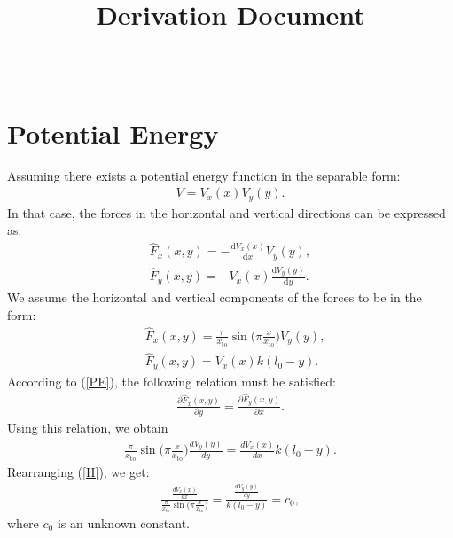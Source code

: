 \documentclass[journal,12pt,onecolumn]{IEEEtran}
\begin{document}
\title{Derivation Document}

\author{
\and\\

}
\maketitle



\section{Potential Energy}
Assuming there exists a potential energy function in the separable form:
\begin{align}
	\label{PE}
	V = V_x(x)V_y(y).
\end{align}
In that case, the forces in the horizontal and vertical directions can be expressed as:
\begin{align}\label{Fx}
\hat{F}_x(x,y) = -\frac{\mathrm{d}V_x(x)}{\mathrm{d} x} V_y(y),\\ \label{Fy}
\hat{F}_y(x,y) = -V_x(x)\frac{\mathrm{d} V_y(y)}{\mathrm{d} y}.
\end{align}
We assume the horizontal and vertical components of the forces to be in the form:
\begin{align}\label{Fxa}
	&\hat{F}_x(x,y) = \frac{\pi}{x_{\text{to}}}\sin\Big(\pi\frac{x}{x_\text{to}}\Big) V_y(y),\\ \label{Fya}
	&\hat{F}_y(x,y) = V_x(x) k (l_0-y).
\end{align}
According to (\ref{PE}), the following relation must be satisfied:
\begin{align}\label{SLIP033}
	\frac{\partial \hat{F}_x(x,y)}{\partial y} = \frac{\partial \hat{F}_y(x,y)}{\partial x}.
\end{align}
Using this relation, we obtain
\begin{align}
	\label{H}
\frac{\pi}{x_{\text{to}}}\sin\Big(\pi\frac{x}{x_\text{to}}\Big)\frac{dV_y(y)}{dy} = \frac{dV_x(x)}{dx} k (l_0-y).
\end{align}
Rearranging (\ref{H}), we get:
\begin{align}
\frac{\frac{dV_x(x)}{dx}}{\frac{\pi}{x_{\text{to}}}\sin\Big(\pi\frac{x}{x_\text{to}}\Big)} = \frac{\frac{dV_y(y)}{dy}}{k (l_0-y)} = c_0,
\end{align}
where $c_0$ is an unknown constant.
\end{document}
